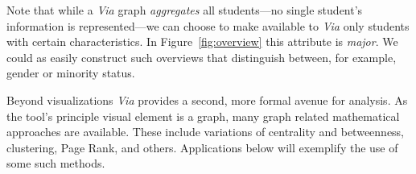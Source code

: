 Note that while a {\em Via} graph {\em aggregates} all students---no
single student's information is represented---we can choose to make
available to {\em Via} only students with certain characteristics. In
Figure~\ref{fig:overview} this attribute is {\em major}. We could as
easily construct such overviews that distinguish between, for example,
gender or minority status.

Beyond visualizations {\em Via} provides a second, more formal avenue
for analysis. As the tool's principle visual element is a graph, many
graph related mathematical approaches are available. These include
variations of centrality and betweenness, clustering, Page Rank, and
others. Applications below will exemplify the use of some such
methods.
